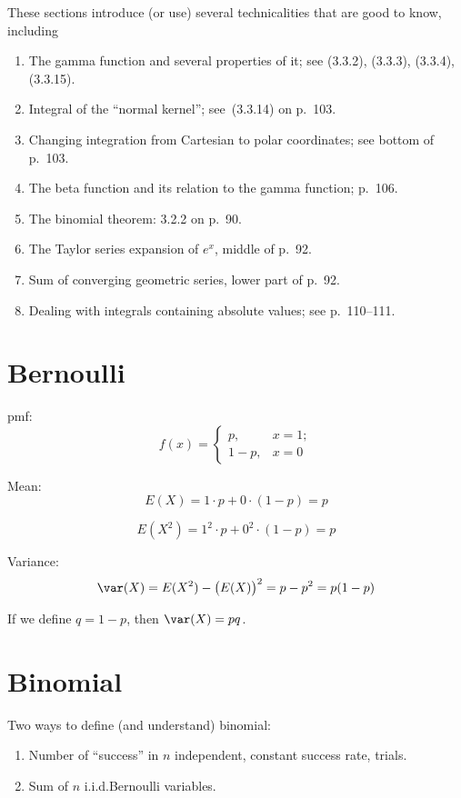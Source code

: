 \documentclass[12pt]{article}
\begin{document}
These sections introduce (or use) several technicalities that are good to know,
including
\begin{enumerate}
\item The gamma function and several properties of it;
    see (3.3.2), (3.3.3), (3.3.4), (3.3.15).
\item Integral of the ``normal kernel''; see~(3.3.14) on p.~103.
\item Changing integration from Cartesian to polar coordinates;
    see bottom of p.~103.
\item The beta function and its relation to the gamma function;
    p.~106.
\item The binomial theorem: 3.2.2 on p.~90.
\item The Taylor series expansion of $e^x$, middle of p.~92.
\item Sum of converging geometric series, lower part of p.~92.
\item Dealing with integrals containing absolute values;
    see p.~110--111.
\end{enumerate}

\section{Bernoulli}

pmf:
\[
f(x) = \begin{cases}
    p, & x = 1;\\
    1 - p, & x = 0
\end{cases}
\]

Mean:
\[
E(X) = 1\cdot p + 0 \cdot (1-p) = p
\]

\[
E(X^2) = 1^2\cdot p + 0^2 \cdot (1-p) = p
\]

Variance:
\[
\var(X) = E(X^2) - \bigl(E(X)\bigr)^2
    = p - p^2
    = p(1-p)
\]

If we define $q = 1 - p$, then
$\var(X) = pq$.

\section{Binomial}

Two ways to define (and understand) binomial:
\begin{enumerate}
\item Number of ``success'' in $n$ independent, constant success rate,
trials.
\item Sum of $n$ i.i.d.\@ Bernoulli variables.
\end{enumerate}
\end{document}
